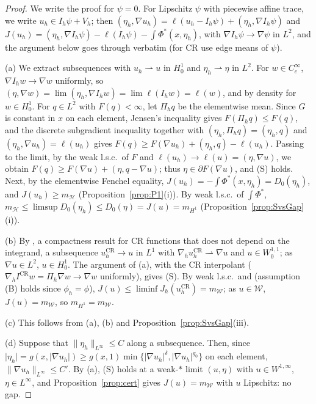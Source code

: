 \documentclass[11pt]{amsart}
\theoremstyle{definition}
\theoremstyle{remark}
\numberwithin{equation}{section}
\newcommand{\abs}[1]{\lvert #1\rvert}
\newcommand{\norm}[1]{\lVert #1\rVert}
\newcommand{\CR}{\mathrm{CR}}
\newcommand{\Wc}{\mathcal W}
\newcommand{\mW}{m_{\mathcal W}}
\newcommand{\mH}{m_{\mathcal H}}
\newcommand{\mHone}{m_{H^1}}
\newcommand{\weak}{\rightharpoonup}
\begin{document}
\begin{proof}
We write the proof for $\psi=0$. For Lipschitz $\psi$ with piecewise affine trace, we write $u_h\in I_h\psi+V_h$; then $(\eta_h,\nabla u_h)=\ell(u_h-I_h\psi)+(\eta_h,\nabla I_h\psi)$ and $J(u_h)=(\eta_h,\nabla I_h\psi)-\ell(I_h\psi)-\int\Phi^*(x,\eta_h)$, with $\nabla I_h\psi\to\nabla\psi$ in $L^2$, and the argument below goes through verbatim (for CR use edge means of $\psi$).

(a) We extract subsequences with $u_h\weak u$ in $H^1_0$ and $\eta_h\weak\eta$ in $L^2$. For $w\in C^\infty_c$, $\nabla I_hw\to\nabla w$ uniformly, so $(\eta,\nabla w)=\lim(\eta_h,\nabla I_hw)=\lim\ell(I_hw)=\ell(w)$, and by density for $w\in H^1_0$. For $q\in L^2$ with $F(q)<\infty$, let $\Pi_hq$ be the elementwise mean. Since $G$ is constant in $x$ on each element, Jensen's inequality gives $F(\Pi_hq)\le F(q)$, and the discrete subgradient inequality together with $(\eta_h,\Pi_hq)=(\eta_h,q)$ and $(\eta_h,\nabla u_h)=\ell(u_h)$ gives $F(q)\ge F(\nabla u_h)+(\eta_h,q)-\ell(u_h)$. Passing to the limit, by the weak l.s.c.\ of $F$ and $\ell(u_h)\to\ell(u)=(\eta,\nabla u)$, we obtain $F(q)\ge F(\nabla u)+(\eta,q-\nabla u)$; thus $\eta\in\partial F(\nabla u)$, and (S) holds. Next, by the elementwise Fenchel equality, $J(u_h)=-\int\Phi^*(x,\eta_h)=D_0(\eta_h)$, and $J(u_h)\ge\mH$ (Proposition~\ref{prop:P1}(i)). By weak l.s.c.\ of $\int\Phi^*$, $\mH\le\limsup D_0(\eta_h)\le D_0(\eta)=J(u)=\mHone$ (Proposition~\ref{prop:SvsGap}(i)).

(b) By \cite[Thm.~4.2]{Ortner2011}, a compactness result for CR functions that does not depend on the integrand, a subsequence $u_h^{\CR}\to u$ in $L^1$ with $\nabla_hu_h^{\CR}\weak\nabla u$ and $u\in W^{1,1}_0$; as $\nabla u\in L^2$, $u\in H^1_0$. The argument of (a), with the CR interpolant ($\nabla_hI^{\CR}w=\Pi_h\nabla w\to\nabla w$ uniformly), gives (S). By weak l.s.c.\ and \cite[Thm.~1]{BalciOrtnerStorn2022} (assumption (B) holds since $\phi_h=\phi$), $J(u)\le\liminf J_h(u_h^{\CR})=\mW$; as $u\in\Wc$, $J(u)=\mW$, so $\mHone=\mW$.

(c) This follows from (a), (b) and Proposition~\ref{prop:SvsGap}(iii).

(d) Suppose that $\norm{\eta_h}_{L^\infty}\le C$ along a subsequence. Then, since $\abs{\eta_h}=g(x,\abs{\nabla u_h})\ge g(x,1)\min\{\abs{\nabla u_h}^{\delta},\abs{\nabla u_h}^{g_0}\}$ on each element, $\norm{\nabla u_h}_{L^\infty}\le C'$. By (a), (S) holds at a weak-$*$ limit $(u,\eta)$ with $u\in W^{1,\infty}$, $\eta\in L^\infty$, and Proposition~\ref{prop:cert} gives $J(u)=\mW$ with $u$ Lipschitz: no gap.
\end{proof}
\end{document}
